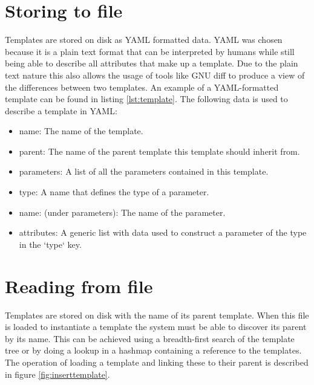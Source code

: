 \section{Storing to file}
Templates are stored on disk as YAML formatted data. YAML was chosen because it is a plain text format that can be interpreted by humans while still being able to describe all attributes that make up a template. 
Due to the plain text nature this also allows the usage of tools like GNU diff to produce a view of the differences between two templates.
An example of a YAML-formatted template can be found in listing \ref{lst:template}.
The following data is used to describe a template in YAML:
\begin{itemize}
	\item name: The name of the template.
	\item parent: The name of the parent template this template should inherit from.
	\item parameters: A list of all the parameters contained in this template.
	\item type: A name that defines the type of a parameter.
	\item name: (under parameters): The name of the parameter.
	\item attributes: A generic list with data used to construct a parameter of the type in the `type` key.
\end{itemize}


\section{Reading from file}
Templates are stored on disk with the name of its parent template.
When this file is loaded to instantiate a template the system must be able to discover its parent by its name.
This can be achieved using a breadth-first search of the template tree or by doing a lookup in a hashmap containing a reference to the templates.
The operation of loading a template and linking these to their parent is described in figure \ref{fig:inserttemplate}.

